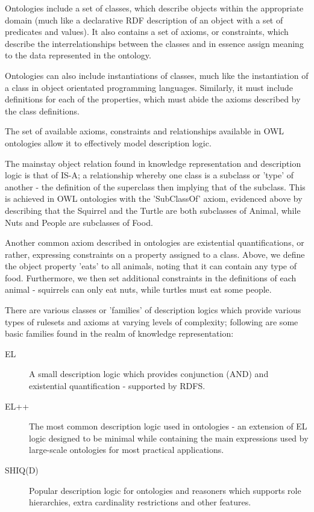\documentclass{article}
\begin{document}
Ontologies include a set of classes, which describe objects within the appropriate 
domain (much like a declarative RDF description of an object with a set of predicates 
and values). It also contains a set of axioms, or constraints, which describe the 
interrelationships between the classes and in essence assign meaning to the
data represented in the ontology.

Ontologies can also include instantiations of classes, much like the
instantiation of a class in object orientated programming languages.
Similarly, it must include definitions for each of the properties, which 
must abide the axioms described by the class definitions.

The set of available axioms, constraints and relationships available in OWL
ontologies allow it to effectively model description logic\cite{desclogic}. 

The mainstay object relation found in knowledge representation and description
logic is that of IS-A; a relationship whereby one class is a subclass or 'type'
of another - the definition of the superclass then implying that of the
subclass. This is achieved in OWL ontologies with the 'SubClassOf' axiom,
evidenced above by describing that the Squirrel and the Turtle are both
subclasses of Animal, while Nuts and People are subclasses of Food.

Another common axiom described in ontologies are existential quantifications, or
rather, expressing constraints on a property assigned to a class. Above, we
define the object property 'eats' to all animals, noting that it can contain any
type of food. Furthermore, we then set additional constraints in the definitions
of each animal - squirrels can only eat nuts, while turtles must eat some
people.

There are various classes or 'families' of description logics which provide various 
types of rulesets and axioms at varying levels of complexity; following are some basic 
families found in the realm of knowledge representation:

\begin{description}
    \item[EL] A small description logic which provides conjunction (AND) and
    existential quantification - supported by RDFS.\cite{rdfs}
    \item[EL++] The most common description logic used in ontologies - an
    extension of EL logic designed to be minimal while containing the main 
    expressions used by large-scale ontologies for most practical 
    applications.\cite{elplusplus}
    \item[SHIQ(D)] Popular description logic for ontologies and reasoners which
    supports role hierarchies, extra cardinality restrictions and other
    features.\cite{shiq}
\end{description}
\end{document}
